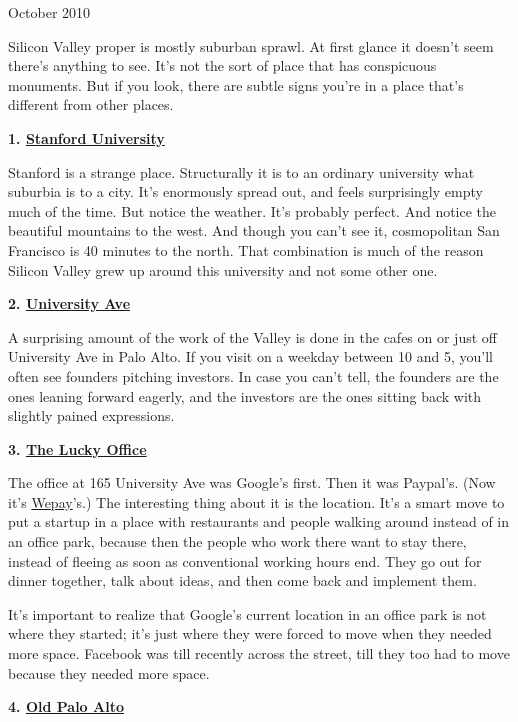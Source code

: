 \documentclass[12pt]{book}
\begin{document}
October 2010

Silicon Valley proper is mostly suburban sprawl. At first glance it
doesn't seem there's anything to see. It's not the sort of place that
has conspicuous monuments. But if you look, there are subtle signs
you're in a place that's different from other places.

\textbf{1.
\href{http://maps.google.com/maps?q=stanford+university}{Stanford
University}}

Stanford is a strange place. Structurally it is to an ordinary
university what suburbia is to a city. It's enormously spread out, and
feels surprisingly empty much of the time. But notice the weather. It's
probably perfect. And notice the beautiful mountains to the west. And
though you can't see it, cosmopolitan San Francisco is 40 minutes to the
north. That combination is much of the reason Silicon Valley grew up
around this university and not some other one.

\textbf{2.
\href{http://maps.google.com/maps?q=university+and+ramona+palo+alto}{University
Ave}}

A surprising amount of the work of the Valley is done in the cafes on or
just off University Ave in Palo Alto. If you visit on a weekday between
10 and 5, you'll often see founders pitching investors. In case you
can't tell, the founders are the ones leaning forward eagerly, and the
investors are the ones sitting back with slightly pained expressions.

\textbf{3.
\href{http://maps.google.com/maps?q=165+university+ave+palo+alto}{The
Lucky Office}}

The office at 165 University Ave was Google's first. Then it was
Paypal's. (Now it's \href{http://wepay.com}{Wepay}'s.) The interesting
thing about it is the location. It's a smart move to put a startup in a
place with restaurants and people walking around instead of in an office
park, because then the people who work there want to stay there, instead
of fleeing as soon as conventional working hours end. They go out for
dinner together, talk about ideas, and then come back and implement
them.

It's important to realize that Google's current location in an office
park is not where they started; it's just where they were forced to move
when they needed more space. Facebook was till recently across the
street, till they too had to move because they needed more space.

\textbf{4. \href{http://maps.google.com/maps?q=old+palo+alto}{Old Palo
Alto}}
\end{document}
